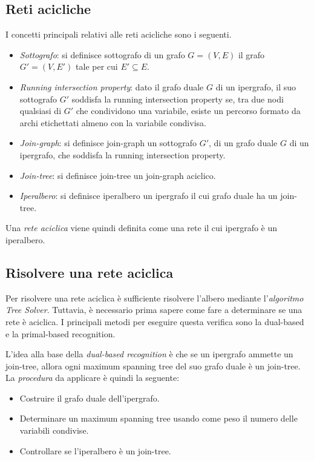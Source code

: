 \documentclass[11pt,oneside]{book}
\begin{document}
\subsection{Reti acicliche}
I concetti principali relativi alle reti acicliche sono i seguenti.
\begin{itemize}
    \item \textit{Sottografo}: si definisce sottografo di un grafo $G=(V,E)$ il grafo $G' = (V, E')$ tale per cui $E' \subseteq E$.
    \item \textit{Running intersection property}: dato il grafo duale $G$ di un ipergrafo, il suo sottografo $G'$ soddisfa la running intersection property se, tra due nodi qualsiasi di $G'$ che condividono una variabile, esiste un percorso formato da archi etichettati almeno con la variabile condivisa.
    \item \textit{Join-graph}: si definisce join-graph un sottografo $G'$, di un grafo duale $G$ di un ipergrafo, che soddisfa la running intersection property.
    \item \textit{Join-tree}: si definisce join-tree un join-graph aciclico.
    \item \textit{Iperalbero}: si definisce iperalbero un ipergrafo il cui grafo duale ha un join-tree.
\end{itemize}
Una \textit{rete aciclica} viene quindi definita come una rete il cui ipergrafo è un iperalbero.

\subsection{Risolvere una rete aciclica}
Per risolvere una rete aciclica è sufficiente risolvere l'albero mediante l'\textit{algoritmo Tree Solver}. Tuttavia, è necessario prima sapere come fare a determinare se una rete è aciclica. I principali metodi per eseguire questa verifica sono la dual-based e la primal-based recognition.

L'idea alla base della \textit{dual-based recognition} è che se un ipergrafo ammette un join-tree, allora ogni maximum spanning tree del suo grafo duale è un join-tree. La \textit{procedura} da applicare è quindi la seguente:
\begin{itemize}
	\item Costruire il grafo duale dell'ipergrafo.
	\item Determinare un maximum spanning tree usando come peso il numero delle variabili condivise.
	\item Controllare se l'iperalbero è un join-tree.
\end{itemize}
\end{document}
